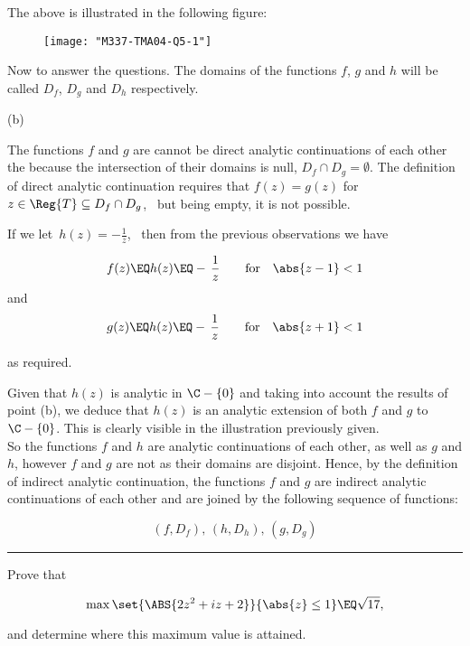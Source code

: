 \documentclass[english,a4paper,11pt]{scrartcl}
\begin{document}
The above is illustrated in the following figure: \\

\begin{figure}[H]
	\centering
	\texttt{[image: "M337-TMA04-Q5-1"]}
\end{figure}

\bigskip
Now to answer the questions. The domains of the functions $f$, $g$ and $h$ will be called $D_f$, $D_g$ and $D_h$ respectively. \\

\newpage
\begin{labeling}{(b) }
  \item [(a)] The functions $f$ and $g$ are cannot be direct analytic continuations of each other the because the intersection of their domains is null, $D_f \cap D_g = \emptyset$. The definition of direct analytic continuation requires that $f(z) = g(z)$ for $z \in \Reg{T} \subseteq D_f \cap D_g$, \, but being empty, it is not possible. \\

\bigskip  
  \item [(b)]  If we let \,$h(z) = - \displaystyle \frac1{z}$, \, then from the previous observations we have
  
\[ f(z) \EQ h(z) \EQ - \, \frac1{z} \qquad \text{for} \quad \abs{z-1} < 1 \]
and
\[ g(z) \EQ h(z) \EQ - \, \frac1{z} \qquad \text{for} \quad \abs{z+1} < 1 \]

as required.

\bigskip  
  \item [(c)]  Given that $h(z)$ is analytic in $\C - \{0\}$ and taking into account the results of point (b), we deduce that $h(z)$ is an analytic extension of both $f$ and $g$ to $\C - \{0\}$. This is clearly visible in the illustration previously given.\\
 
\bigskip
So the functions $f$ and $h$ are analytic continuations of each other, as well as $g$ and $h$, however $f$ and $g$ are not as their domains are disjoint. Hence, by the definition of indirect analytic continuation, the functions $f$ and $g$ are indirect analytic continuations of each other and are joined by the following sequence of functions:

\[ (f, D_f), \, (h, D_h), \, (g, D_g) \]
  
      
\end{labeling}



\comment{===========================================================}
\noindent\rule[0.5ex]{\linewidth}{1pt} 
\newpage
\begin{Question}{}

Prove that

\[ \max \set{\ABS{2z^2 + iz + 2}} {\abs{z} \leq 1} \EQ \sqrt{17}, \]

\bigskip
and determine where this maximum value is attained. 

\bigskip
\end{Question}
\end{document}
